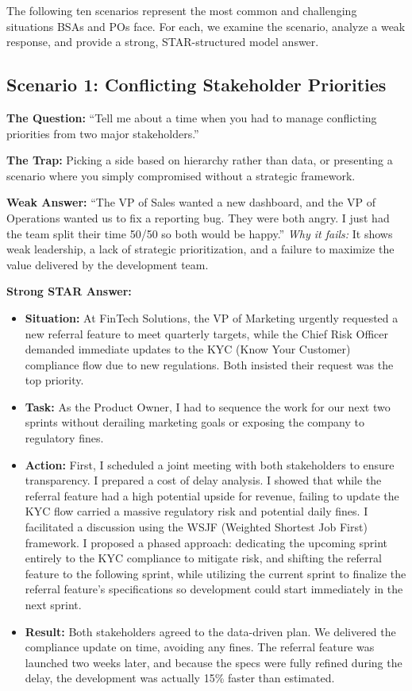 \documentclass[
  11pt,
  openany,
  oneside]{book}
\providecommand{\tightlist}{%
  \setlength{\itemsep}{0pt}\setlength{\parskip}{0pt}}
\begin{document}
The following ten scenarios represent the most common and challenging
situations BSAs and POs face. For each, we examine the scenario, analyze
a weak response, and provide a strong, STAR-structured model answer.

\subsection{Scenario 1: Conflicting Stakeholder
Priorities}\label{scenario-1-conflicting-stakeholder-priorities}

\textbf{The Question:} ``Tell me about a time when you had to manage
conflicting priorities from two major stakeholders.''

\textbf{The Trap:} Picking a side based on hierarchy rather than data,
or presenting a scenario where you simply compromised without a
strategic framework.

\textbf{Weak Answer:} ``The VP of Sales wanted a new dashboard, and the
VP of Operations wanted us to fix a reporting bug. They were both angry.
I just had the team split their time 50/50 so both would be happy.''
\emph{Why it fails:} It shows weak leadership, a lack of strategic
prioritization, and a failure to maximize the value delivered by the
development team.

\textbf{Strong STAR Answer:}

\begin{itemize}
\tightlist
\item
  \textbf{Situation:} At FinTech Solutions, the VP of Marketing urgently
  requested a new referral feature to meet quarterly targets, while the
  Chief Risk Officer demanded immediate updates to the KYC (Know Your
  Customer) compliance flow due to new regulations. Both insisted their
  request was the top priority.
\item
  \textbf{Task:} As the Product Owner, I had to sequence the work for
  our next two sprints without derailing marketing goals or exposing the
  company to regulatory fines.
\item
  \textbf{Action:} First, I scheduled a joint meeting with both
  stakeholders to ensure transparency. I prepared a cost of delay
  analysis. I showed that while the referral feature had a high
  potential upside for revenue, failing to update the KYC flow carried a
  massive regulatory risk and potential daily fines. I facilitated a
  discussion using the WSJF (Weighted Shortest Job First) framework. I
  proposed a phased approach: dedicating the upcoming sprint entirely to
  the KYC compliance to mitigate risk, and shifting the referral feature
  to the following sprint, while utilizing the current sprint to
  finalize the referral feature's specifications so development could
  start immediately in the next sprint.
\item
  \textbf{Result:} Both stakeholders agreed to the data-driven plan. We
  delivered the compliance update on time, avoiding any fines. The
  referral feature was launched two weeks later, and because the specs
  were fully refined during the delay, the development was actually 15\%
  faster than estimated.
\end{itemize}
\end{document}
